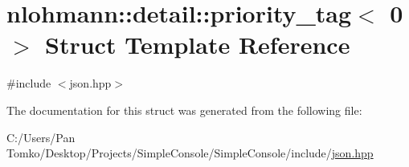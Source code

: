\hypertarget{structnlohmann_1_1detail_1_1priority__tag_3_010_01_4}{}\section{nlohmann\+::detail\+::priority\+\_\+tag$<$ 0 $>$ Struct Template Reference}
\label{structnlohmann_1_1detail_1_1priority__tag_3_010_01_4}


{\ttfamily \#include $<$json.\+hpp$>$}



The documentation for this struct was generated from the following file\+:\begin{DoxyCompactItemize}
\item 
C\+:/\+Users/\+Pan Tomko/\+Desktop/\+Projects/\+Simple\+Console/\+Simple\+Console/include/\mbox{\hyperlink{json_8hpp}{json.\+hpp}}\end{DoxyCompactItemize}
